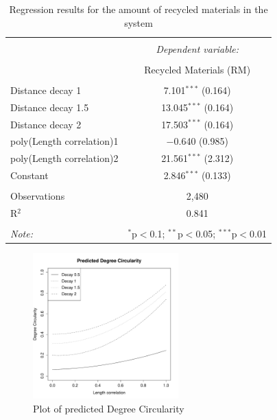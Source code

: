 \documentclass[fleqn,10pt]{wlscirep}
\begin{document}
{\begin{table}[]  \centering
  \caption{Regression results for the amount of recycled materials in the system } 
  \label{Reg1} 
\begin{tabular}{@{\extracolsep{5pt}}lc} 
\\[-1.8ex]\hline 
\hline \\[-1.8ex] 
 & \multicolumn{1}{c}{\textit{Dependent variable:}} \\ 
\cline{2-2} 
\\[-1.8ex] & Recycled Materials (RM) \\ 
\hline \\[-1.8ex] 
 Distance decay 1 & 7.101$^{***}$ (0.164) \\ 
 Distance decay 1.5 & 13.045$^{***}$ (0.164) \\ 
 Distance decay 2 & 17.503$^{***}$ (0.164) \\ 
 poly(Length correlation)1 & $-$0.640 (0.985) \\ 
 poly(Length correlation)2 & 21.561$^{***}$ (2.312) \\ 
 Constant & 2.846$^{***}$ (0.133) \\ 
\hline \\[-1.8ex] 
Observations & 2,480 \\ 
R$^{2}$ & 0.841 \\ 
\hline 
\hline \\[-1.8ex] 
\textit{Note:}  & \multicolumn{1}{r}{$^{*}$p$<$0.1; $^{**}$p$<$0.05; $^{***}$p$<$0.01} \\ 
\end{tabular} 
\end{table} 

\begin{figure}
\centering
\includegraphics[width=0.5\textwidth]{figures/Lcor2.pdf}
\caption{Plot of predicted Degree Circularity}
\label{Pred1}
\end{figure}

}
\end{document}
